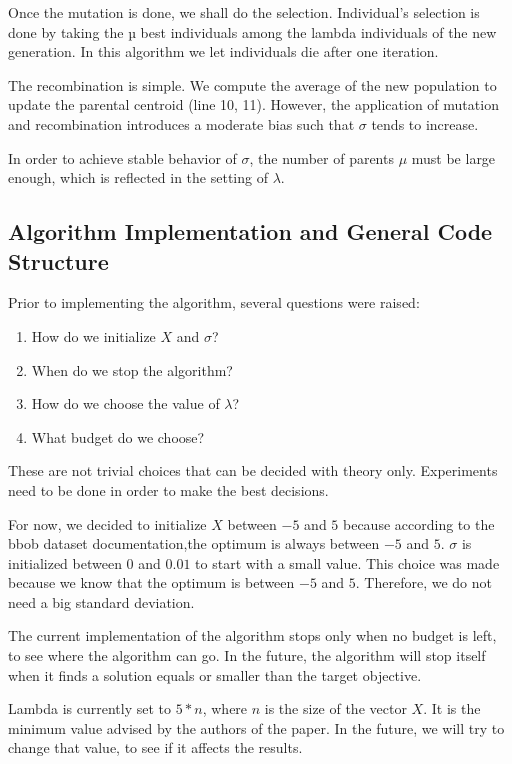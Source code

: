 \documentclass{article}
\begin{document}
Once the mutation is done, we shall do the selection. Individual’s selection is done by taking the µ best individuals among the lambda individuals of the new generation. In this algorithm we let individuals die after one iteration. 

The recombination is simple. We compute the average of the new population to update the parental centroid (line 10, 11). 
However, the application of mutation and recombination introduces a moderate bias such that $\sigma$ tends to increase.

In order to achieve stable behavior of $\sigma$, the number of parents $\mu$ must be large enough, which is reflected in the setting of $\lambda$.


\subsection{Algorithm Implementation and General Code Structure}

Prior to implementing the algorithm, several questions were raised:
\begin{enumerate}
\item How do we initialize $X$ and $\sigma$?
\item When do we stop the algorithm?
\item How do we choose the value of $\lambda$?
\item What budget do we choose?
\end{enumerate}

These are not trivial choices that can be decided with theory only. Experiments need to be done in order to make the best decisions. 


For now, we decided to initialize $X$ between $-5$ and $5$ because according to the bbob dataset documentation,the optimum is always between $-5$ and $5$. $\sigma$ is initialized between $0$ and $0.01$ to start with a small value. This choice was made because we know that the optimum is between $-5$ and $5$. Therefore, we do not need a big standard deviation. 

The current implementation of the algorithm stops only when no budget is left, to see where the algorithm can go. In the future, the algorithm will stop itself when it finds a solution equals or smaller than the target objective.

Lambda is currently set to $5*n$, where $n$ is the size of the vector $X$. It is the minimum value advised by the authors of the paper. In the future, we will try to change that value, to see if it affects the results.
\end{document}
